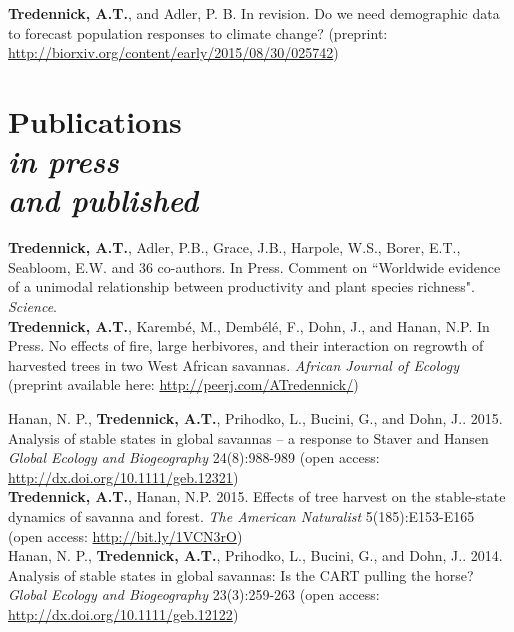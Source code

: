\documentclass[margin,line]{resume}
\begin{document}
\begin{resume}
        \textbf{Tredennick, A.T.},  and Adler, P. B. In revision. Do we need demographic data to forecast population responses to climate change? (preprint: \href{http://biorxiv.org/content/early/2015/08/30/025742}{http://biorxiv.org/content/early/2015/08/30/025742})

	\section{\mysidestyle Publications\\ \textsl{\footnotesize in press}\\ \textsl{\footnotesize and published}}  
	\textbf{Tredennick, A.T.}, Adler, P.B., Grace, J.B., Harpole, W.S., Borer, E.T., Seabloom, E.W. and 36 co-authors. In Press. Comment on ``Worldwide evidence of a unimodal relationship between productivity and plant species richness". \textsl{Science}. \vspace{-6mm}\\%
	
	\textbf{Tredennick, A.T.}, Karemb\'{e}, M., Demb\'{e}l\'{e}, F., Dohn, J., and Hanan, N.P. In Press. No effects of fire, large herbivores, and their interaction on regrowth of harvested trees in two West African savannas. \textsl{African Journal of Ecology} (preprint available here: \href{http://peerj.com/ATredennick/}{http://peerj.com/ATredennick/})

	Hanan, N. P., \textbf{Tredennick, A.T.}, Prihodko, L., Bucini, G., and Dohn, J.. 2015. Analysis of stable states in global savannas – a response to Staver and Hansen 	\textsl{Global Ecology and Biogeography} 24(8):988-989 (open access: \href{http://dx.doi.org/10.1111/geb.12321}{http://dx.doi.org/10.1111/geb.12321}) \vspace{-6mm}\\%
   
     	\textbf{Tredennick, A.T.}, Hanan, N.P. 2015. Effects of tree harvest on the stable-state dynamics of savanna and forest. \textsl{The American Naturalist} 5(185):E153-E165  
(open access: \href{http://www.jstor.org/stable/10.1086/680475}{http://bit.ly/1VCN3rO}) \vspace{-6mm} \\%
	
	Hanan, N. P., \textbf{Tredennick, A.T.}, Prihodko, L., Bucini, G., and Dohn, J.. 2014. Analysis of stable states in global savannas: Is the CART pulling the horse? 	\textsl{Global Ecology and Biogeography} 23(3):259-263 (open access: \href{http://dx.doi.org/10.1111/geb.12122}{http://dx.doi.org/10.1111/geb.12122}) \vspace{-6mm}\\%
	

\end{resume}
\end{document}
